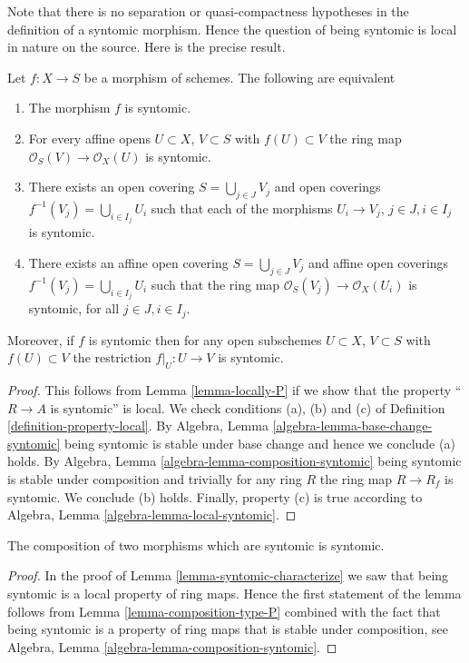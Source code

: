 \medskip\noindent
Note that there is no separation or quasi-compactness hypotheses in the
definition of a syntomic morphism. Hence the question of being syntomic
is local in nature on the source. Here is the precise result.

\begin{lemma}
\label{lemma-syntomic-characterize}
Let $f : X \to S$ be a morphism of schemes.
The following are equivalent
\begin{enumerate}
\item The morphism $f$ is syntomic.
\item For every affine opens $U \subset X$, $V \subset S$
with $f(U) \subset V$ the ring map
$\mathcal{O}_S(V) \to \mathcal{O}_X(U)$ is syntomic.
\item There exists an open covering $S = \bigcup_{j \in J} V_j$
and open coverings $f^{-1}(V_j) = \bigcup_{i \in I_j} U_i$ such
that each of the morphisms $U_i \to V_j$, $j\in J, i\in I_j$
is syntomic.
\item There exists an affine open covering $S = \bigcup_{j \in J} V_j$
and affine open coverings $f^{-1}(V_j) = \bigcup_{i \in I_j} U_i$ such
that the ring map $\mathcal{O}_S(V_j) \to \mathcal{O}_X(U_i)$ is
syntomic, for all $j\in J, i\in I_j$.
\end{enumerate}
Moreover, if $f$ is syntomic then for
any open subschemes $U \subset X$, $V \subset S$ with $f(U) \subset V$
the restriction $f|_U : U \to V$ is syntomic.
\end{lemma}

\begin{proof}
This follows from Lemma \ref{lemma-locally-P} if we show that
the property ``$R \to A$ is syntomic'' is local.
We check conditions (a), (b) and (c) of Definition
\ref{definition-property-local}.
By Algebra, Lemma \ref{algebra-lemma-base-change-syntomic}
being syntomic is stable under base change and hence
we conclude (a) holds. By
Algebra, Lemma \ref{algebra-lemma-composition-syntomic}
being syntomic is stable under composition and trivially for any ring
$R$ the ring map $R \to R_f$ is syntomic.
We conclude (b) holds. Finally, property (c) is true
according to Algebra, Lemma \ref{algebra-lemma-local-syntomic}.
\end{proof}

\begin{lemma}
\label{lemma-composition-syntomic}
The composition of two morphisms which are syntomic is syntomic.
\end{lemma}

\begin{proof}
In the proof of Lemma \ref{lemma-syntomic-characterize}
we saw that being syntomic is a local property of ring maps.
Hence the first statement of the lemma follows from
Lemma \ref{lemma-composition-type-P} combined
with the fact that being syntomic is a property of ring maps that is
stable under composition, see
Algebra, Lemma \ref{algebra-lemma-composition-syntomic}.
\end{proof}


